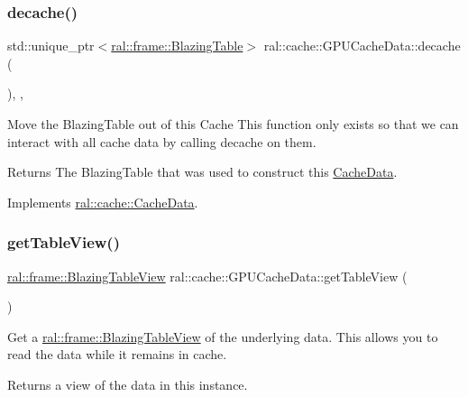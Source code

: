 \subsubsection{\texorpdfstring{decache()}{decache()}}
{\footnotesize\ttfamily std\+::unique\+\_\+ptr$<$\hyperlink{classral_1_1frame_1_1BlazingTable}{ral\+::frame\+::\+Blazing\+Table}$>$ ral\+::cache\+::\+G\+P\+U\+Cache\+Data\+::decache (\begin{DoxyParamCaption}{ }\end{DoxyParamCaption})\hspace{0.3cm}{\ttfamily [inline]}, {\ttfamily [override]}, {\ttfamily [virtual]}}

Move the Blazing\+Table out of this Cache This function only exists so that we can interact with all cache data by calling decache on them. \begin{DoxyReturn}{Returns}
The Blazing\+Table that was used to construct this \hyperlink{classral_1_1cache_1_1CacheData}{Cache\+Data}. 
\end{DoxyReturn}


Implements \hyperlink{classral_1_1cache_1_1CacheData_a2db8fdd2151babd7a07f4c6e246b710c}{ral\+::cache\+::\+Cache\+Data}.

\mbox{\label{classral_1_1cache_1_1GPUCacheData_af2765b19b50907081b1e73c07a2155eb}} 
\subsubsection{\texorpdfstring{get\+Table\+View()}{getTableView()}}
{\footnotesize\ttfamily \hyperlink{classral_1_1frame_1_1BlazingTableView}{ral\+::frame\+::\+Blazing\+Table\+View} ral\+::cache\+::\+G\+P\+U\+Cache\+Data\+::get\+Table\+View (\begin{DoxyParamCaption}{ }\end{DoxyParamCaption})\hspace{0.3cm}{\ttfamily [inline]}}

Get a \hyperlink{classral_1_1frame_1_1BlazingTableView}{ral\+::frame\+::\+Blazing\+Table\+View} of the underlying data. This allows you to read the data while it remains in cache. \begin{DoxyReturn}{Returns}
a view of the data in this instance. 
\end{DoxyReturn}
\mbox{\label{classral_1_1cache_1_1GPUCacheData_a35d56396384cd4380141d47291d3e55f}} 
